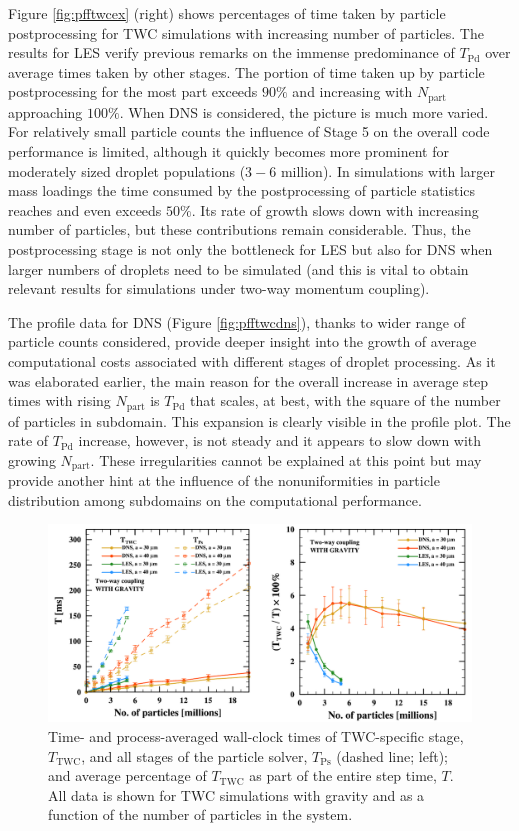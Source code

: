 \documentclass{pracamgren}
\begin{document}
Figure \ref{fig:pfftwcex} (right) shows percentages of time taken by particle postprocessing for TWC simulations with increasing number of particles.
The results for LES verify previous remarks on the immense predominance of $T_{\text{Pd}}$ over average times taken by other stages.
The portion of time taken up by particle postprocessing for the most part exceeds $90 \%$ and increasing with $N_{\text{part}}$ approaching $100 \%$.
When DNS is considered, the picture is much more varied.
For relatively small particle counts the influence of Stage 5 on the overall code performance is limited, although it quickly becomes more prominent for moderately sized droplet populations ($3-6$ million).
In simulations with larger mass loadings the time consumed by the postprocessing of particle statistics reaches and even exceeds $50 \%$.
Its rate of growth slows down with increasing number of particles, but these contributions remain considerable.
Thus, the postprocessing stage is not only the bottleneck for LES but also for DNS when larger numbers of droplets need to be simulated (and this is vital to obtain relevant results for simulations under two-way momentum coupling).  

The profile data for DNS (Figure \ref{fig:pfftwcdns}), thanks to wider range of particle counts considered, provide deeper insight into the growth of average computational costs associated with different stages of droplet processing.
As it was elaborated earlier, the main reason for the overall increase in average step times with rising $N_{\text{part}}$ is $T_{\text{Pd}}$ that scales, at best, with the square of the number of particles in subdomain.
This expansion is clearly visible in the profile plot.
The rate of $T_{\text{Pd}}$ increase, however, is not steady and it appears to slow down with growing $N_{\text{part}}$.
These irregularities cannot be explained at this point but may provide another hint at the influence of the nonuniformities in particle distribution among subdomains on the computational performance.

\begin{figure}[h]
\centering
\includegraphics[width=13.5cm]{figures/3-11_pfftwctwc.pdf}
\caption{
Time- and process-averaged wall-clock times of TWC-specific stage, $T_{\text{TWC}}$, and all stages of the particle solver, $T_{\text{Ps}}$ (dashed line; left); and average percentage of $T_{\text{TWC}}$ as part of the entire step time, $T$.
All data is shown for TWC simulations with gravity and as a function of the number of particles in the system.
}
\label{fig:pfftwctwc}
\end{figure}
\end{document}
